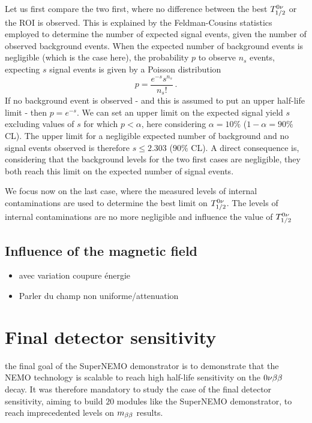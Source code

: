 Let us first compare the two first, where no difference between the best $T_{1/2}^{0\nu}$ or the ROI is observed.
This is explained by the Feldman-Cousins statistics employed to determine the number of expected signal events, given the number of observed background events.
When the expected number of background events is negligible (which is the case here), the probability $p$ to observe $n_{s}$ events, expecting $s$ signal events is given by a Poisson distribution
\begin{equation}
p = \frac{e^{-s}s^{n_{s}}}{n_{s}!}\,.
\end{equation}
If no background event is observed - and this is assumed to put an upper half-life limit - then $p = e^{-s}$.
We can set an upper limit on the expected signal yield $s$ excluding values of $s$ for which $p < \alpha$, here considering $\alpha = 10\%$ ($1-\alpha = 90\%$ CL).
The upper limit for a negligible expected number of background and no signal events observed is therefore $s \leq 2.303$ ($90\%$ CL).
A direct consequence is, considering that the background levels for the two first cases are negligible, they both reach this limit on the expected number of signal events.

We focus now on the last case, where the measured levels of internal contaminations are used to determine the best limit on $T_{1/2}^{0\nu}$.
The levels of internal contaminations are no more negligible and influence the value of $T_{1/2}^{0\nu}$




\subsection{Influence of the magnetic field}
\begin{itemize}
\item avec variation coupure énergie\\
\item Parler du champ non uniforme/attenuation
\end{itemize}



\section{Final detector sensitivity}

the final goal of the SuperNEMO demonstrator is to demonstrate that the NEMO technology is scalable to reach high half-life sensitivity on the $0\nu\beta\beta$ decay.
It was therefore mandatory to study the case of the final detector sensitivity, aiming to build $20$ modules like the SuperNEMO demonstrator, to reach imprecedented levels on $m_{\beta\beta}$ results.

